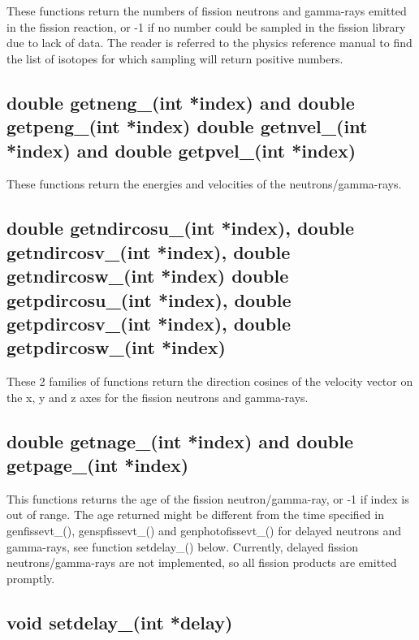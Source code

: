 These functions return the numbers of fission neutrons and gamma-rays emitted in the fission reaction, or -1 if no number could be sampled in the fission library due to lack of data. The reader is referred to the physics reference manual to find the list of isotopes for which sampling will return positive numbers.

\subsection*{double getneng\_(int *index) and 
double getpeng\_(int *index) \newline
double getnvel\_(int *index) and 
double getpvel\_(int *index)}

These functions return the energies and velocities of the neutrons/gamma-rays.

\subsection*{double getndircosu\_(int *index), double getndircosv\_(int *index), \newline double getndircosw\_(int *index) \newline \newline
double getpdircosu\_(int *index), double getpdircosv\_(int *index), \newline double getpdircosw\_(int *index)}

These 2 families of functions return the direction cosines of the velocity vector on the x, y and z axes for the fission 
neutrons and gamma-rays.

\subsection*{double getnage\_(int *index) and double 
getpage\_(int *index)}

This functions returns the age of the fission neutron/gamma-ray, or -1 if index is out of range. The age returned might be 
different from the time specified in genfissevt\_(), genspfissevt\_() and genphotofissevt\_() for delayed neutrons and gamma-rays, see function setdelay\_() below. Currently, delayed fission neutrons/gamma-rays are not implemented, so all fission products 
are emitted promptly.

\subsection*{void setdelay\_(int *delay)}~\label{setdelay}

